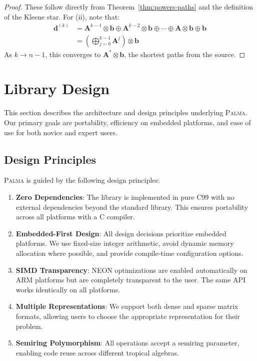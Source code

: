\documentclass[11pt,a4paper]{article}
\theoremstyle{plain}
\theoremstyle{definition}
\newcommand{\palma}{\textsc{Palma}}
\newcommand{\mat}[1]{\mathbf{#1}}
\newcommand{\vect}[1]{\mathbf{#1}}
\begin{document}
\begin{proof}
These follow directly from Theorem~\ref{thm:powers-paths} and the definition of the Kleene star. For (ii), note that:
\begin{align*}
    \vect{d}^{(k)} &= \mat{A}^{k-1} \otimes \vect{b} \oplus \mat{A}^{k-2} \otimes \vect{b} \oplus \cdots \oplus \mat{A} \otimes \vect{b} \oplus \vect{b} \\
    &= \left(\bigoplus_{j=0}^{k-1} \mat{A}^j\right) \otimes \vect{b}
\end{align*}
As $k \to n-1$, this converges to $\mat{A}^* \otimes \vect{b}$, the shortest paths from the source.
\end{proof}

\section{Library Design}
\label{sec:design}

This section describes the architecture and design principles underlying \palma{}. Our primary goals are portability, efficiency on embedded platforms, and ease of use for both novice and expert users.

\subsection{Design Principles}

\palma{} is guided by the following design principles:

\begin{enumerate}[leftmargin=*]
    \item \textbf{Zero Dependencies}: The library is implemented in pure C99 with no external dependencies beyond the standard library. This ensures portability across all platforms with a C compiler.
    
    \item \textbf{Embedded-First Design}: All design decisions prioritize embedded platforms. We use fixed-size integer arithmetic, avoid dynamic memory allocation where possible, and provide compile-time configuration options.
    
    \item \textbf{SIMD Transparency}: NEON optimizations are enabled automatically on ARM platforms but are completely transparent to the user. The same API works identically on all platforms.
    
    \item \textbf{Multiple Representations}: We support both dense and sparse matrix formats, allowing users to choose the appropriate representation for their problem.
    
    \item \textbf{Semiring Polymorphism}: All operations accept a semiring parameter, enabling code reuse across different tropical algebras.
\end{enumerate}
\end{document}
